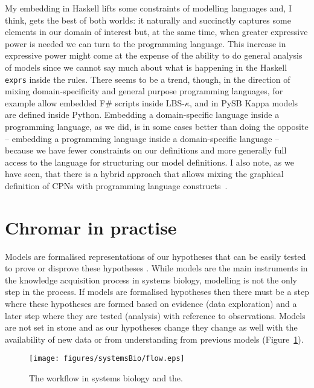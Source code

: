 My embedding in Haskell lifts some constraints of modelling languages and, I
think, gets the best of both worlds: it naturally and succinctly captures some
elements in our domain of interest but, at the same time, when greater
expressive power is needed we can turn to the programming language. This
increase in expressive power might come at the expense of the ability to do
general analysis of models since we cannot say much about what is happening in
the Haskell \texttt{exprs} inside the rules. There seems to be a trend, though,
in the direction of mixing domain-specificity and general purpose programming
languages, for example \citet{pedersen_high-level_2015} allow embedded F\#
scripts inside LBS-$\kappa$, and in PySB \citep{lopez_programming_2013} Kappa
models are defined inside Python. Embedding a domain-specific language inside a
programming language, as we did, is in some cases better than doing the opposite
-- embedding a programming language inside a domain-specific language -- because
we have fewer constraints on our definitions and more generally full access to
the language for structuring our model definitions. I also note, as we have
seen, that there is a hybrid approach that allows mixing the graphical
definition of CPNs with programming language constructs~\citep[ML
language;][]{jensen_coloured_1987}.

\section{Chromar in practise}
Models are formalised representations of our hypotheses that can be easily
tested to prove or disprove these hypotheses
\citep{gunawardena_models_2014}. While models are the main instruments in the
knowledge acquisition process in systems biology, modelling is not the only step
in the process. If models are formalised hypotheses then there must be a step
where these hypotheses are formed based on evidence (data exploration) and a
later step where they are tested (analysis) with reference to
observations. Models are not set in stone and as our hypotheses change they
change as well with the availability of new data or from understanding from
previous models (Figure~\ref{fig:flowSystems}).

\begin{figure}
    \centering
    \texttt{[image: figures/systemsBio/flow.eps]}
    \caption{The workflow in systems biology and the.}
    \label{fig:flowSystems}
\end{figure}

